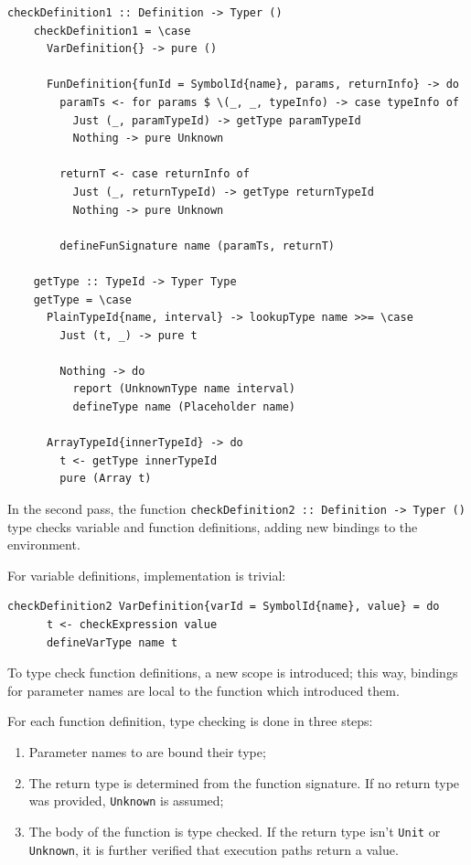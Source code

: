 \documentclass[UdineBachThesis,american,11pt]{PhdThesis}
\begin{document}
  \begin{Verbatim}[gobble=4,fontsize=\small]
    checkDefinition1 :: Definition -> Typer ()
    checkDefinition1 = \case
      VarDefinition{} -> pure ()

      FunDefinition{funId = SymbolId{name}, params, returnInfo} -> do
        paramTs <- for params $ \(_, _, typeInfo) -> case typeInfo of
          Just (_, paramTypeId) -> getType paramTypeId
          Nothing -> pure Unknown

        returnT <- case returnInfo of
          Just (_, returnTypeId) -> getType returnTypeId
          Nothing -> pure Unknown

        defineFunSignature name (paramTs, returnT)

    getType :: TypeId -> Typer Type
    getType = \case
      PlainTypeId{name, interval} -> lookupType name >>= \case
        Just (t, _) -> pure t

        Nothing -> do
          report (UnknownType name interval)
          defineType name (Placeholder name)

      ArrayTypeId{innerTypeId} -> do
        t <- getType innerTypeId
        pure (Array t)
  \end{Verbatim}

  In the second pass, the function
  \mbox{\texttt{checkDefinition2 :: Definition -> Typer ()}} type checks
  variable and function definitions, adding new bindings to the environment.

  For variable definitions, implementation is trivial:

  \begin{Verbatim}[gobble=4,fontsize=\small]
    checkDefinition2 VarDefinition{varId = SymbolId{name}, value} = do
      t <- checkExpression value
      defineVarType name t
  \end{Verbatim}

  To type check function definitions, a new scope is introduced; this way,
  bindings for parameter names are local to the function which introduced them.

  For each function definition, type checking is done in three steps:

  \begin{enumerate}
    \item Parameter names to are bound their type;

    \item The return type is determined from the function signature. If no
    return type was provided, \mbox{\texttt{Unknown}} is assumed;

    \item The body of the function is type checked. If the return type isn't
    \mbox{\texttt{Unit}} or \mbox{\texttt{Unknown}}, it is further verified that
    execution paths return a value.
  \end{enumerate}
\end{document}
